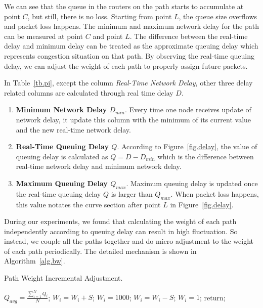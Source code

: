 We can see that the queue in the routers on the path starts to accumulate at point $C$, but still, there is no loss. Starting from point $L$, the queue size overflows and packet loss happens. The minimum and maximum network delay for the path can be measured at point $C$ and point $L$. The difference between the real-time delay and minimum delay can be treated as the approximate queuing delay which represents congestion situation on that path. By observing the real-time queuing delay, we can adjust the weight of each path to properly assign future packets.

In Table~\ref{tb.pi}, except the column \emph{Real-Time Network Delay}, other three delay related columns are calculated through real time delay $D$.

\begin{enumerate}
\item \textbf{Minimum Network Delay $D_{min}$}. Every time one node receives update of network delay, it update this column with the minimum of its current value and the new real-time network delay.
\item \textbf{Real-Time Queuing Delay $Q$}. According to Figure~\ref{fig.delay}, the value of queuing delay is calculated as $Q=D-D_{min}$ which is the difference between real-time network delay and minimum network delay.
\item \textbf{Maximum Queuing Delay $Q_{max}$}. Maximum queuing delay is updated once the real-time queuing delay $Q$ is larger than $Q_{max}$. When packet loss happens, this value notates the curve section after point $L$ in Figure~\ref{fig.delay}.
\end{enumerate}


During our experiments, we found that calculating the weight of each path independently according to queuing delay can result in high fluctuation. So instead, we couple all the paths together and do micro adjustment to the weight of each path periodically. The detailed mechanism is shown in Algorithm~\ref{alg.bw}.

\begin{algorithm}
\caption{Path Weight Incremental Adjustment.}
\label{alg.bw}
\begin{algorithmic}[1]
\STATE  $Q_{avg}= \frac{\sum_{i=1}^{N}Q_i}{N}$;
    \STATE $W_i=W_i+S$;
	    \STATE $W_i=1000$;
	\ENDIF
\ELSE
    \STATE $W_i=W_i-S$;
	    \STATE $W_i=1$;
	\ENDIF
\ENDIF
\STATE return;
\end{algorithmic}
\end{algorithm}

